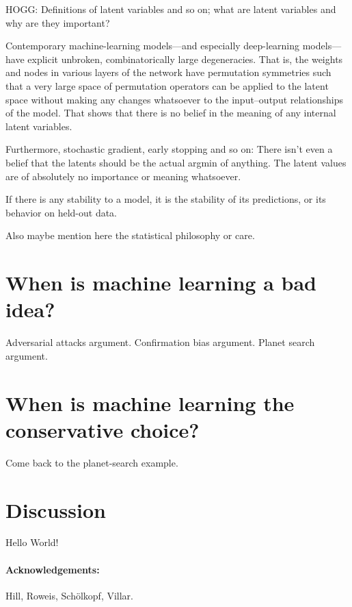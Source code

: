 \documentclass[11pt]{article}
\begin{document}
HOGG: Definitions of latent variables and so on; what are latent variables and why are they important?

Contemporary machine-learning models---and especially deep-learning models---have explicit unbroken, combinatorically large degeneracies.
That is, the weights and nodes in various layers of the network have permutation symmetries such that a very large space of permutation operators can be applied to the latent space without making any changes whatsoever to the input--output relationships of the model.
That shows that there is no belief in the meaning of any internal latent variables.

Furthermore, stochastic gradient, early stopping and so on:
There isn't even a belief that the latents should be the actual argmin of anything.
The latent values are of absolutely no importance or meaning whatsoever.

If there is any stability to a model, it is the stability of its predictions, or its behavior on held-out data.

Also maybe mention here the statistical philosophy or care.

\section{When is machine learning a bad idea?}

Adversarial attacks argument. Confirmation bias argument. Planet search argument.

\section{When is machine learning the conservative choice?}

Come back to the planet-search example.

\section{Discussion}\label{sec:discussion}

Hello World!

\paragraph{Acknowledgements:}
Hill, Roweis, Sch\"olkopf, Villar.



\end{document}
